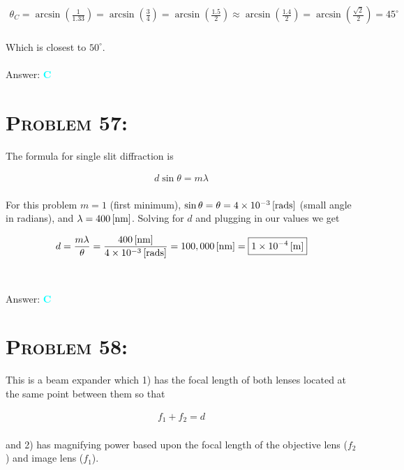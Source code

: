 \documentclass{article}
\providecommand{\e}[1]{\ensuremath{\times 10^{#1}}}
\begin{document}
\begin{gather}
\theta_{C} = \arcsin{\left(\frac{1}{1.33}\right)} = \arcsin{\left(\frac{3}{4}\right)} = \arcsin{\left(\frac{1.5}{2}\right)} \approx  \arcsin{\left(\frac{1.4}{2}\right)} = \arcsin{\left(\frac{\sqrt{2}}{2}\right)} = 45^{\circ}\nonumber
\end{gather}
\\
Which is closest to $50^{\circ}$.
\\\\
Answer: \textbf{\textcolor{cyan}C}\\


\section{\textsc{Problem 57:}} The formula for single slit diffraction is 

\begin{gather}
d \sin{\theta} = m \lambda
\end{gather}
\\
For this problem $m = 1$ (first minimum), $\sin{\theta} = \theta = \unit[4\e{-3}]{[rads]}$ (small angle in radians), and $\lambda = \unit[400]{[nm]}$. Solving for $d$ and plugging in our values we get

\begin{gather}
d = \frac{m \lambda}{\theta} = \frac{\unit[400]{[nm]}}{\unit[4\e{-3}]{[rads]}} = \unit[100,000]{[nm]} = \boxed{\unit[1\e{-4}]{[m]}}\nonumber
\end{gather}
\\\\
Answer: \textbf{\textcolor{cyan}C}\\


\section{\textsc{Problem 58:}} This is a beam expander which 1) has the focal length of both lenses located at the same point between them so that 

\begin{gather}
\label {eq:beam expander} f_{1} + f_{2} = d
\end{gather}
\\
and 2) has magnifying power based upon the focal length of the objective lens ($f_{2}$) and image lens ($f_{1}$).
\end{document}
